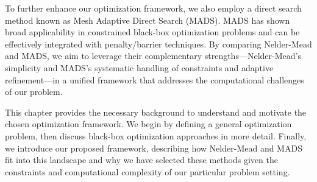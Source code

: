 To further enhance our optimization framework, we also employ a direct search method known as Mesh Adaptive Direct Search (MADS). MADS has shown broad applicability in constrained black-box optimization problems and can be effectively integrated with penalty/barrier techniques. By comparing Nelder-Mead and MADS, we aim to leverage their complementary strengths—Nelder-Mead’s simplicity and MADS’s systematic handling of constraints and adaptive refinement—in a unified framework that addresses the computational challenges of our problem.

This chapter provides the necessary background to understand and motivate the chosen optimization framework. We begin by defining a general optimization problem, then discuss black-box optimization approaches in more detail. Finally, we introduce our proposed framework, describing how Nelder-Mead and MADS fit into this landscape and why we have selected these methods given the constraints and computational complexity of our particular problem setting.



